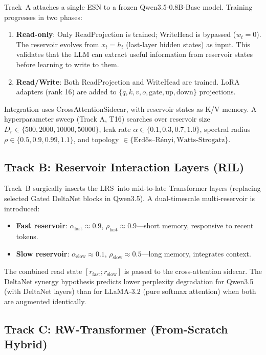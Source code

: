 \documentclass[11pt,a4paper]{article}
\newcommand{\LRS}{\textsc{LRS}}
\theoremstyle{definition}
\begin{document}
Track~A attaches a single ESN to a frozen Qwen3.5-0.8B-Base model.  Training
progresses in two phases:
\begin{enumerate}
  \item \textbf{Read-only}: Only ReadProjection is trained; WriteHead is
    bypassed ($w_t = 0$).  The reservoir evolves from $x_t = h_t$
    (last-layer hidden states) as input.  This validates that the LLM can
    extract useful information from reservoir states before learning to write
    to them.
  \item \textbf{Read/Write}: Both ReadProjection and WriteHead are trained.
    LoRA adapters (rank 16) are added to $\{q, k, v, o, \text{gate},
    \text{up}, \text{down}\}$ projections.
\end{enumerate}
Integration uses CrossAttentionSidecar, with reservoir states as K/V memory.
A hyperparameter sweep (Track A, T16) searches over reservoir size
$D_r \in \{500, 2000, 10000, 50000\}$, leak rate $\alpha \in \{0.1, 0.3,
0.7, 1.0\}$, spectral radius $\rho \in \{0.5, 0.9, 0.99, 1.1\}$, and
topology $\in \{\text{Erdős–Rényi}, \text{Watts-Strogatz}\}$.

\subsection{Track B: Reservoir Interaction Layers (RIL)}
\label{sec:track_b}

Track~B surgically inserts the \LRS\ into mid-to-late Transformer layers
(replacing selected Gated DeltaNet blocks in Qwen3.5).  A dual-timescale
multi-reservoir is introduced:
\begin{itemize}
  \item \textbf{Fast reservoir}: $\alpha_{\mathrm{fast}} \approx 0.9$,
    $\rho_{\mathrm{fast}} \approx 0.9$---short memory, responsive to recent
    tokens.
  \item \textbf{Slow reservoir}: $\alpha_{\mathrm{slow}} \approx 0.1$,
    $\rho_{\mathrm{slow}} \approx 0.5$---long memory, integrates context.
\end{itemize}
The combined read state $[r_{\mathrm{fast}}; r_{\mathrm{slow}}]$ is passed to
the cross-attention sidecar.  The DeltaNet synergy hypothesis predicts lower
perplexity degradation for Qwen3.5 (with DeltaNet layers) than for LLaMA-3.2
(pure softmax attention) when both are augmented identically.

\subsection{Track C: RW-Transformer (From-Scratch Hybrid)}
\label{sec:track_c}
\end{document}
